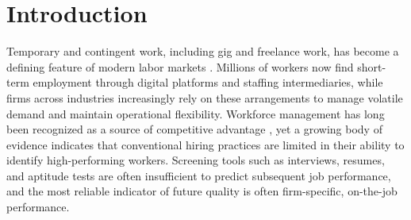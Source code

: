 \documentclass[opre,blindrev]{informs3}
\begin{document}
%


\section{Introduction}

Temporary and contingent work, including gig and freelance work, has become a defining feature of modern labor markets \citep{wood2019good, wu2024gig}. Millions of workers now find short-term employment through digital platforms and staffing intermediaries, while firms across industries increasingly rely on these arrangements to manage volatile demand and maintain operational flexibility. Workforce management has long been recognized as a source of competitive advantage \citep{bartlett2002building}, yet a growing body of evidence indicates that conventional hiring practices are limited in their ability to identify high-performing workers. Screening tools such as interviews, resumes, and aptitude tests are often %
insufficient to predict subsequent job performance, and the most reliable indicator of future quality is often firm-specific, on-the-job performance.
\end{document}
